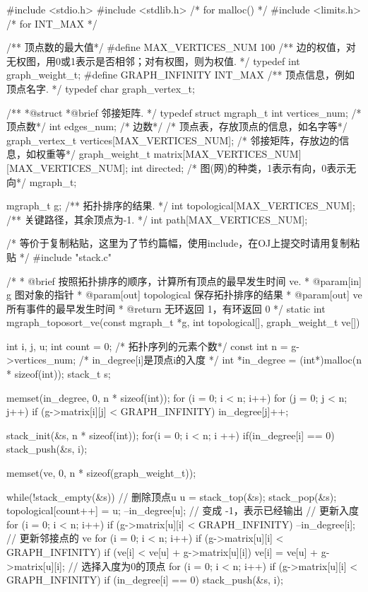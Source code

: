 \begin{Codex}[label=mgraph_critical_path.c]
#include <stdio.h>
#include <stdlib.h>  /* for malloc() */
#include <limits.h>  /* for INT_MAX */

/** 顶点数的最大值*/
#define MAX_VERTICES_NUM 100
/** 边的权值，对无权图，用0或1表示是否相邻；对有权图，则为权值. */
typedef int graph_weight_t;
#define GRAPH_INFINITY INT_MAX
/** 顶点信息，例如顶点名字. */
typedef char graph_vertex_t;

/**
 *@struct
 *@brief 邻接矩阵.
 */
typedef struct mgraph_t {
    int vertices_num; /* 顶点数*/
    int edges_num; /* 边数*/
    /* 顶点表，存放顶点的信息，如名字等*/
    graph_vertex_t vertices[MAX_VERTICES_NUM];
    /* 邻接矩阵，存放边的信息，如权重等*/
    graph_weight_t matrix[MAX_VERTICES_NUM][MAX_VERTICES_NUM];
    int directed; /* 图(网)的种类，1表示有向，0表示无向*/
} mgraph_t;

mgraph_t g;
/** 拓扑排序的结果. */
int topological[MAX_VERTICES_NUM];
/** 关键路径，其余顶点为-1. */
int path[MAX_VERTICES_NUM];


/* 等价于复制粘贴，这里为了节约篇幅，使用include，在OJ上提交时请用复制粘贴 */
#include "stack.c"


/*
  * @brief 按照拓扑排序的顺序，计算所有顶点的最早发生时间 ve.
  * @param[in] g 图对象的指针
  * @param[out] topological 保存拓扑排序的结果
  * @param[out] ve 所有事件的最早发生时间
  * @return 无环返回 1，有环返回 0
  */
static int mgraph_toposort_ve(const mgraph_t *g, int topological[],
        graph_weight_t ve[]) {
    int i, j, u;
    int count = 0; /* 拓扑序列的元素个数*/
    const int n = g->vertices_num;
    /* in_degree[i]是顶点i的入度 */
    int *in_degree = (int*)malloc(n * sizeof(int));
    stack_t s;

    memset(in_degree, 0, n * sizeof(int));
    for (i = 0; i < n; i++) {
        for (j = 0; j < n; j++) {
            if (g->matrix[i][j] < GRAPH_INFINITY)
                in_degree[j]++;
        }
    }

    stack_init(&s, n * sizeof(int));
    for(i = 0; i < n; i ++) {
        if(in_degree[i] == 0) {
            stack_push(&s, i);
        }
    }

    memset(ve, 0, n * sizeof(graph_weight_t));

    while(!stack_empty(&s)) {
        // 删除顶点u
        u = stack_top(&s); stack_pop(&s);
        topological[count++] = u;
        --in_degree[u];  // 变成 -1，表示已经输出
        // 更新入度
        for (i = 0; i < n; i++) if (g->matrix[u][i] < GRAPH_INFINITY) {
            --in_degree[i];
        }
        // 更新邻接点的 ve
        for (i = 0; i < n; i++) if (g->matrix[u][i] < GRAPH_INFINITY) {
            if (ve[i] < ve[u] + g->matrix[u][i])
                ve[i] = ve[u] + g->matrix[u][i];
        }
        // 选择入度为0的顶点
        for (i = 0; i < n; i++) if (g->matrix[u][i] < GRAPH_INFINITY) {
            if (in_degree[i] == 0) stack_push(&s, i);
        }
    }

}
\end{Codex}
